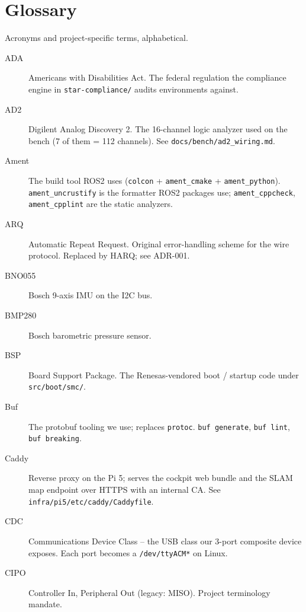 
\section{Glossary}
\label{section:glossary}

Acronyms and project-specific terms, alphabetical.

\begin{description}
  \item[ADA] Americans with Disabilities Act. The federal regulation
        the compliance engine in \texttt{star-compliance/} audits
        environments against.
  \item[AD2] Digilent Analog Discovery 2. The 16-channel logic
        analyzer used on the bench (7 of them = 112 channels). See
        \texttt{docs/bench/ad2\_wiring.md}.
  \item[Ament] The build tool ROS2 uses (\texttt{colcon} +
        \texttt{ament\_cmake} + \texttt{ament\_python}).
        \texttt{ament\_uncrustify} is the formatter ROS2 packages
        use; \texttt{ament\_cppcheck}, \texttt{ament\_cpplint} are
        the static analyzers.
  \item[ARQ] Automatic Repeat Request. Original error-handling
        scheme for the wire protocol. Replaced by HARQ;
        see ADR-001.
  \item[BNO055] Bosch 9-axis IMU on the I2C bus.
  \item[BMP280] Bosch barometric pressure sensor.
  \item[BSP] Board Support Package. The Renesas-vendored boot /
        startup code under \texttt{src/boot/smc/}.
  \item[Buf] The protobuf tooling we use; replaces \texttt{protoc}.
        \texttt{buf generate}, \texttt{buf lint}, \texttt{buf breaking}.
  \item[Caddy] Reverse proxy on the Pi 5; serves the cockpit web
        bundle and the SLAM map endpoint over HTTPS with an internal
        CA. See \texttt{infra/pi5/etc/caddy/Caddyfile}.
  \item[CDC] Communications Device Class -- the USB class our 3-port
        composite device exposes. Each port becomes a
        \texttt{/dev/ttyACM*} on Linux.
  \item[CIPO] Controller In, Peripheral Out (legacy: MISO). Project
        terminology mandate.

\end{description}
